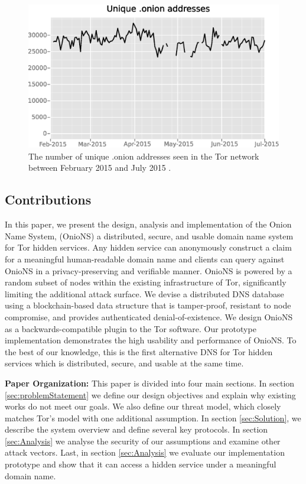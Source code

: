\documentclass[conference]{IEEEtran}
\begin{document}
\begin{figure}[htbp]
	\centering
	\includegraphics[width=\linewidth]{../assets/images/Tor/onion_2015-02_2015-07.eps}
	\caption{The number of unique .onion addresses seen in the Tor network between February 2015 and July 2015 \cite{kadianakis2015extrapolating}\cite{TorMetrics}.}
	\label{fig:OnionCount}
\end{figure}

\subsection{Contributions}

In this paper, we present the design, analysis and implementation of the Onion Name System, (OnioNS) a distributed, secure, and usable domain name system for Tor hidden services. Any hidden service can anonymously construct a claim for a meaningful human-readable domain name and clients can query against OnioNS in a privacy-preserving and verifiable manner. OnioNS is powered by a random subset of nodes within the existing infrastructure of Tor, significantly limiting the additional attack surface. We devise a distributed DNS database using a blockchain-based data structure that is tamper-proof, resistant to node compromise, and provides authenticated denial-of-existence. We design OnioNS as a backwards-compatible plugin to the Tor software. Our prototype implementation demonstrates the high usability and performance of OnioNS. To the best of our knowledge, this is the first alternative DNS for Tor hidden services which is distributed, secure, and usable at the same time.

\textbf{Paper Organization:} This paper is divided into four main sections. In section \ref{sec:problemStatement} we define our design objectives and explain why existing works do not meet our goals. We also define our threat model, which closely matches Tor's model with one additional assumption. In section \ref{sec:Solution}, we describe the system overview and define several key protocols. In section \ref{sec:Analysis} we analyse the security of our assumptions and examine other attack vectors. Last, in section \ref{sec:Analysis} we evaluate our implementation prototype and show that it can access a hidden service under a meaningful domain name.
\end{document}
